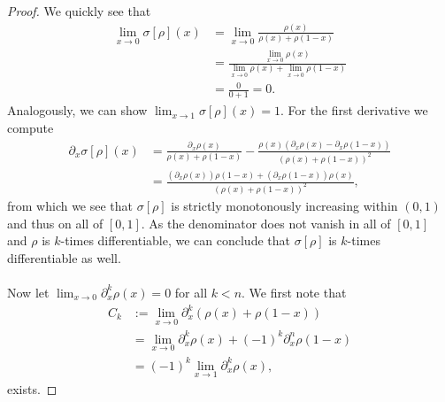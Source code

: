 \documentclass{article}
\begin{document}
\begin{proof}
    We quickly see that
    \begin{align}
        \lim_{x \rightarrow 0}  \sigma[\rho](x) 
        &= \lim_{x \rightarrow 0} \frac{\rho(x)}{\rho(x) + \rho(1-x)} \\
        &= \frac{\lim_{x \rightarrow 0} \rho(x)}{\lim_{x \rightarrow 0} \rho(x) + \lim_{x \rightarrow 0} \rho(1 - x)} \\
        &= \frac{0}{0 + 1} = 0.
    \end{align}
    Analogously, we can show $\lim_{x \rightarrow 1}  \sigma[\rho](x) = 1$.
    For the first derivative we compute
    \begin{align}
        \partial_{x} \sigma[\rho](x) &= \frac{\partial_{x} \rho(x)}{\rho(x) + \rho(1-x)} - \frac{\rho(x) (\partial_{x} \rho(x) - \partial_{x} \rho(1-x))}{(\rho(x) + \rho(1-x))^{2}} \\
        &= \frac{(\partial_{x} \rho(x)) \rho(1-x) + (\partial_{x} \rho(1-x)) \rho(x)}{(\rho(x) + \rho(1-x))^{2}} \label{eq:first-derivative-of-general-sigmoid},
    \end{align}
    from which we see that $\sigma[\rho]$ is strictly monotonously increasing within $(0, 1)$ and thus on all of $[0,1]$.
    As the denominator does not vanish in all of $[0, 1]$ and $\rho$ is $k$-times differentiable, we can conclude that $\sigma[\rho]$ is $k$-times differentiable as well.
    \\  ~ \\
    Now let $\lim_{x \rightarrow 0} \partial_{x}^{k} \rho(x) = 0$ for all $k<n$. We first note that
    \begin{align}
        C_{k} &:= \lim_{x \rightarrow 0} \partial_{x}^{k} (\rho(x) + \rho(1-x)) \\
        &= \lim_{x \rightarrow 0} \partial_{x}^{k} \rho(x) + (-1)^{k} \partial_{x}^{n} \rho(1-x)\\
        &= (-1)^{k} \lim_{x \rightarrow 1} \partial_{x}^{k} \rho(x),
    \end{align}
    exists.
    

\end{proof}
\end{document}
